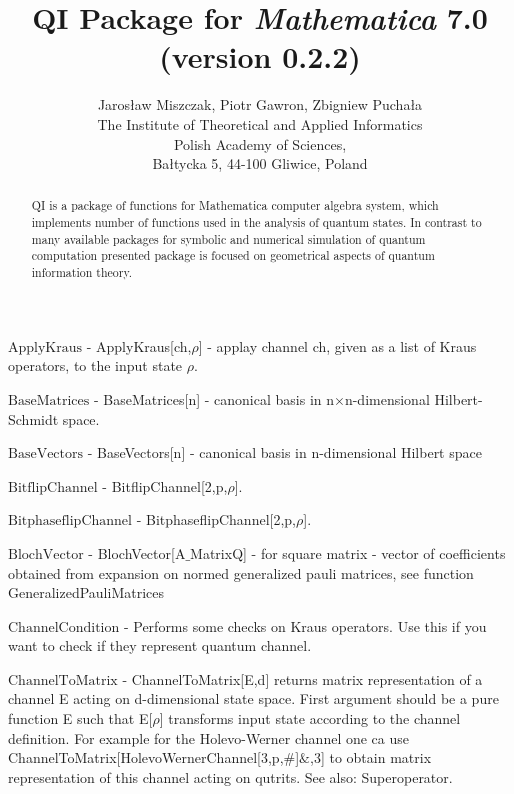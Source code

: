 \documentclass[a4paper,12pt]{article}
\begin{document}
\title{QI Package for \emph{Mathematica} 7.0 (version 0.2.2)}\author{Jaros{\l}aw Miszczak, Piotr Gawron, Zbigniew Pucha{\l}a\\ \small{The Institute of Theoretical and Applied Informatics}\\
\small{Polish Academy of Sciences},\\ \small{Ba{\l}tycka 5, 44-100 Gliwice, Poland}}
\maketitle
\begin{abstract}QI is a package of functions for Mathematica computer algebra system, which implements 
number of functions used in the analysis of quantum states. In contrast to many available 
packages for symbolic and numerical simulation of quantum computation presented package is focused 
on geometrical aspects of quantum information theory.\end{abstract}
\textbf{$ \text{ApplyKraus} $ } - ApplyKraus[ch,$\rho $] - applay channel ch, given as a list of Kraus operators, to the input state $\rho $.$  $

\textbf{$ \text{BaseMatrices} $ } - BaseMatrices[n] - canonical basis in n$\times $n-dimensional Hilbert-Schmidt space.$  $

\textbf{$ \text{BaseVectors} $ } - BaseVectors[n] - canonical basis in n-dimensional Hilbert space$  $

\textbf{$ \text{BitflipChannel} $ } - BitflipChannel[2,p,$\rho $].$  $

\textbf{$ \text{BitphaseflipChannel} $ } - BitphaseflipChannel[2,p,$\rho $].$  $

\textbf{$ \text{BlochVector} $ } - BlochVector[A$\_$MatrixQ] - for square matrix - vector of coefficients obtained from expansion on normed generalized pauli matrices, see function GeneralizedPauliMatrices$  $

\textbf{$ \text{ChannelCondition} $ } - Performs some checks on Kraus operators. Use this if you want to check if they represent quantum channel.$  $

\textbf{$ \text{ChannelToMatrix} $ } - ChannelToMatrix[E,d] returns matrix representation of a channel E acting on d-dimensional state space. First argument should be a pure function E such that E[$\rho $] transforms input state according to the channel definition. For example for the Holevo-Werner channel one ca use ChannelToMatrix[HolevoWernerChannel[3,p,$\#$]$\&$,3] to obtain matrix representation of this channel acting on qutrits. See also: Superoperator.$  $
\end{document}
